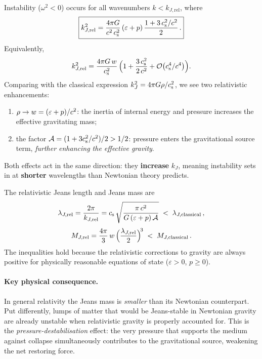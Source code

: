 Instability ($\omega^{2} < 0$) occurs for all wavenumbers
$k < k_{J,\mathrm{rel}}$, where
\begin{equation}
\label{eq:rel-13-kJ}
\boxed{
  k_{J,\mathrm{rel}}^{2}
  = \frac{4\pi G}{c^{2}\,c_{\mathrm{s}}^{2}}\,
    (\varepsilon + p)\,
    \frac{1 + 3\,c_{\mathrm{s}}^{2}/c^{2}}{2}\,.
}
\end{equation}
Equivalently,
\begin{equation}
\label{eq:rel-13-kJ-expanded}
  k_{J,\mathrm{rel}}^{2}
  = \frac{4\pi G\,w}{c_{\mathrm{s}}^{2}}\,
    \Bigl(
      1 + \frac{3\,c_{\mathrm{s}}^{2}}{2\,c^{2}}
      + \mathcal{O}\bigl(c_{\mathrm{s}}^{4}/c^{4}\bigr)
    \Bigr).
\end{equation}
Comparing with the classical expression
$k_{J}^{2} = 4\pi G\rho/c_{\mathrm{s}}^{2}$, we see two relativistic
enhancements:
\begin{enumerate}
\item $\rho \to w = (\varepsilon + p)/c^{2}$: the inertia
  of internal energy and pressure increases the effective
  gravitating mass;
\item the factor $\mathcal{A} = (1 + 3c_{\mathrm{s}}^{2}/c^{2})/2 > 1/2$:
  pressure enters the gravitational source term,
  \emph{further enhancing the effective gravity}.
\end{enumerate}
Both effects act in the same direction: they
\textbf{increase} $k_{J}$, meaning instability sets in at
\textbf{shorter} wavelengths than Newtonian theory predicts.

The relativistic Jeans length and Jeans mass are
\begin{equation}
\label{eq:rel-13-lambdaJ}
  \lambda_{J,\mathrm{rel}}
  = \frac{2\pi}{k_{J,\mathrm{rel}}}
  = c_{\mathrm{s}}\,
    \sqrt{
      \frac{\pi\,c^{2}}
           {G\,(\varepsilon + p)\,\mathcal{A}}
    }
  \;<\; \lambda_{J,\mathrm{classical}}\,,
\end{equation}
\begin{equation}
\label{eq:rel-13-MJ}
  M_{J,\mathrm{rel}}
  = \frac{4\pi}{3}\,w\,
    \Bigl(\frac{\lambda_{J,\mathrm{rel}}}{2}\Bigr)^{\!3}
  \;<\; M_{J,\mathrm{classical}}\,.
\end{equation}
The inequalities hold because the relativistic corrections to
gravity are always positive for physically reasonable equations of
state ($\varepsilon > 0$, $p \geq 0$).

\paragraph{Key physical consequence.}
In general relativity the Jeans mass is \emph{smaller} than its
Newtonian counterpart.  Put differently, lumps of matter that
would be Jeans-stable in Newtonian gravity are already unstable
when relativistic gravity is properly accounted for.  This is the
\emph{pressure-destabilisation} effect: the very pressure that
supports the medium against collapse simultaneously contributes to
the gravitational source, weakening the net restoring force.

